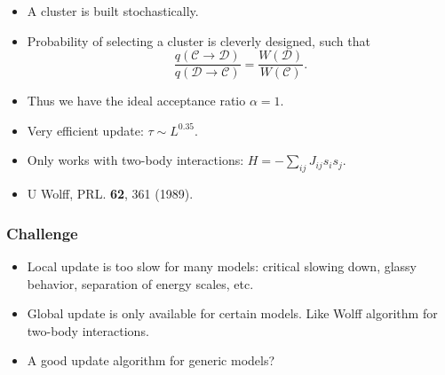 \documentclass[xcolor=table, 10pt, aspectratio=169]{beamer}
\begin{document}
\begin{frame}
\begin{center}
    \begin{itemize}
      \item A cluster is built stochastically.
      \item Probability of selecting a cluster is cleverly designed, such that
      \[\frac{q(\mathcal C\rightarrow\mathcal D)}{q(\mathcal D\rightarrow\mathcal C)}=\frac{W(\mathcal D)}{W(\mathcal C)}.\]
      \item Thus we have the ideal acceptance ratio $\alpha=1$.
      \item Very efficient update: $\tau\sim L^{0.35}$.
      \item Only works with two-body interactions: $H=-\sum_{ij}J_{ij}s_is_j.$
      \item U Wolff, PRL. \textbf{62}, 361 (1989).
    \end{itemize}
  \end{center}
\end{frame}

\begin{frame}
  \frametitle{Challenge}
  \begin{itemize}
    \item Local update is too slow for many models: critical slowing down, glassy behavior, separation of energy scales, etc.
    \item Global update is only available for certain models. Like Wolff algorithm for two-body interactions.
    \item A good update algorithm for generic models?
  \end{itemize}
\end{frame}

\end{document}
